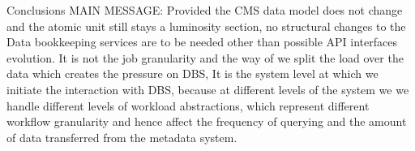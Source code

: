 \documentclass{beamer}
\begin{document}
\begin{frame}{Conclusions}
MAIN MESSAGE: Provided the CMS data model does not change and the atomic unit still stays a luminosity section, no structural changes to the Data bookkeeping services are to be needed other than possible API interfaces evolution. It is not the job granularity and the way of we split the load over the data  which creates the pressure on DBS, It is the system level at which we initiate the interaction with DBS, because at different levels of the system we  we handle different levels of workload abstractions, which represent different workflow granularity and hence affect the frequency of  querying  and the amount of data transferred from the metadata system.

\end{frame}
\end{document}
